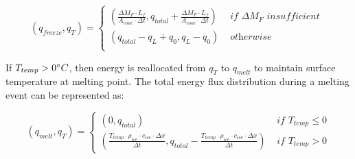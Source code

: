\begin{equation}
	(q_{freeze}, q_{T}) = \left\{ \begin{array}{ll}
		(\frac{\Delta M_{F} \cdot L_f
		}{A_{cone} \cdot \Delta t}
		, q_{total}+\frac{\Delta M_{F} \cdot L_f
		}{A_{cone} \cdot \Delta t})          & \textit{ if  } \Delta M_{F} \textit{ insufficient } \\
		(q_{total}-q_{L}+q_{0}, q_{L}-q_{0}) & \textit{ otherwise }                                \\
	\end{array} \right.
\end{equation}

If $T_{temp} > 0 ^{\circ} C$, then energy is reallocated from $q_{T}$ to $q_{melt}$ to maintain surface
temperature at melting point. The total energy flux distribution during a melting event can be represented as:

\begin{equation}
	(q_{melt}, q_{T}) = \left\{ \begin{array}{ll}
		(0, q_{total})
		                                                                                                                                                               & \textit{ if } T_{temp} \leq 0 \\
		(\frac{T_{temp} \cdot \rho_{ice} \cdot c_{ice} \cdot \Delta x}{\Delta t}, q_{total}-\frac{T_{temp} \cdot \rho_{ice} \cdot c_{ice} \cdot \Delta x}{\Delta t}  ) & \textit{ if } T_{temp} > 0
	\end{array} \right.
\end{equation}

